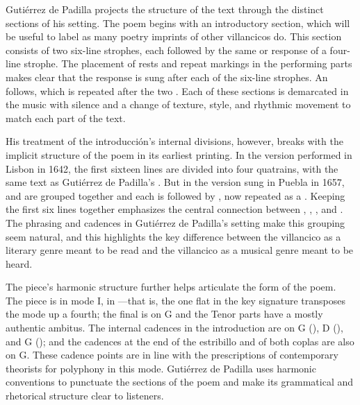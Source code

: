 Gutiérrez de Padilla projects the structure of the text through the distinct
sections of his setting.
The poem begins with an introductory section, which will be useful to label
 as many poetry imprints of other villancicos do.
This section consists of two six-line strophes, each followed by the same
 or response of a four-line strophe.
The placement of rests and repeat markings in the performing parts makes clear
that the response is sung after each of the six-line strophes.
An  follows, which is repeated after the two .
Each of these sections is demarcated in the music with silence and a change of
texture, style, and rhythmic movement to match each part of the text.

His treatment of the introducción's internal divisions, however, breaks with
the implicit structure of the poem in its earliest printing.
In the version performed in Lisbon in 1642, the first sixteen lines are divided
into four quatrains, with the same text as Gutiérrez de Padilla's
.
But in the version sung in Puebla in 1657,  and
 are grouped together and each is followed by
, now repeated as a .
Keeping the first six lines together emphasizes the central connection between
, , , and
.
The phrasing and cadences in Gutiérrez de Padilla's setting make this grouping
seem natural, and this highlights the key difference between the villancico as a
literary genre meant to be read and the villancico as a musical genre meant to
be heard.

The piece's harmonic structure further helps articulate the form of the poem.
The piece is in mode I, in ---that is, the one flat in the
key signature transposes the mode up a fourth; the final is on G and the Tenor
parts have a mostly authentic ambitus.
The internal cadences in the introduction are on G (), D
(), and G (); and the cadences at the end of the
estribillo and of both coplas are also on G.
These cadence points are in line with the prescriptions of contemporary
theorists for polyphony in this mode.%
    \Autocites
    [873--882, 883--885, 907--912]{Cerone:Melopeo}
    [364--406]{Judd:RenaissanceModalTheory}
    {Barnett:TonalOrganization17C}
Gutiérrez de Padilla uses harmonic conventions to punctuate the sections of the
poem and make its grammatical and rhetorical structure clear to listeners.

